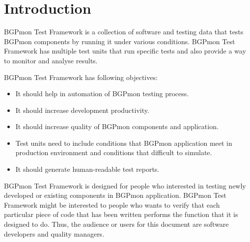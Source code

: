 \section{Introduction}
\label{sec:intro}

BGPmon Test Framework  is a collection of software and testing data that tests BGPmon components by running it under various conditions. BGPmon Test Framework has multiple test units that run specific tests and also provide a way to monitor and  analyse results. 

BGPmon Test Framework has following objectives: 
\begin{itemize}
  \item{It should help in automation of BGPmon testing process.}
  \item{It should increase development productivity.}
  \item{It should increase quality of BGPmon components and application.}
  \item{Test units need to include conditions that BGPmon application meet in production environment and conditions that difficult to simulate.}
  \item{It should generate human-readable test reports.}
\end{itemize}

BGPmon Test Framework is designed for  people who interested in testing newly developed or existing components in BGPmon application. BGPmon Test Framework might be interested to people who wants to verify that each particular piece of code that has been written performs the function that it is designed to do. Thus, the audience or users for this document are software developers and quality
managers.
  

